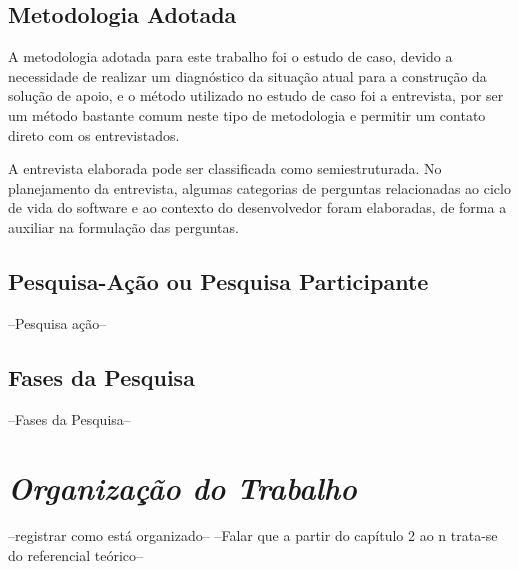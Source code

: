 \subsection{Metodologia Adotada}

A metodologia adotada para este trabalho foi o estudo de caso, devido a necessidade de realizar um diagnóstico da situação atual para a construção da solução de apoio, e o método utilizado no estudo de caso foi a entrevista, por ser um método bastante comum neste tipo de metodologia e permitir um contato direto com os entrevistados. 

A entrevista elaborada pode ser classificada como semiestruturada. No planejamento da entrevista, algumas categorias de perguntas relacionadas ao ciclo de vida do software e ao contexto do desenvolvedor foram elaboradas, de forma a auxiliar na formulação das perguntas.

\subsection{Pesquisa-Ação ou Pesquisa Participante}

--Pesquisa ação--

\subsection{Fases da Pesquisa}

--Fases da Pesquisa--

\section{\textit{Organização do Trabalho}}

--registrar como está organizado--
--Falar que a partir do capítulo 2 ao n trata-se do referencial teórico--

